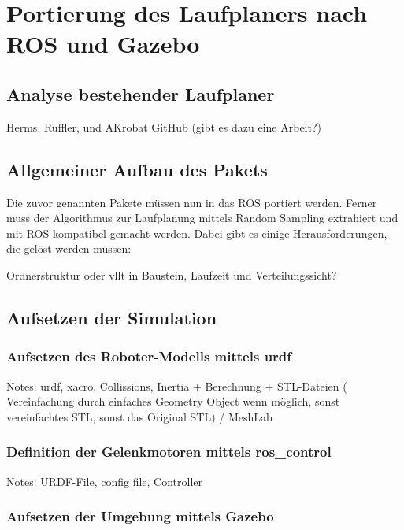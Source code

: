 \chapter{Portierung des Laufplaners nach ROS und Gazebo}

\section{Analyse bestehender Laufplaner}

Herms, Ruffler, und AKrobat GitHub (gibt es dazu eine Arbeit?)

\section{Allgemeiner Aufbau des Pakets}

Die zuvor genannten Pakete müssen nun in das \ac{ROS} portiert werden. Ferner muss der Algorithmus zur Laufplanung mittels Random Sampling extrahiert und mit \ac{ROS} kompatibel gemacht werden. Dabei gibt es einige Herausforderungen, die gelöst werden müssen:



Ordnerstruktur oder vllt in Baustein, Laufzeit und Verteilungssicht?

\section{Aufsetzen der Simulation}

\subsection{Aufsetzen des Roboter-Modells mittels urdf}

Notes: urdf, xacro, Collissions, Inertia + Berechnung + STL-Dateien ( Vereinfachung durch einfaches Geometry Object wenn möglich, sonst vereinfachtes STL, sonst das Original STL) / MeshLab

\subsection{Definition der Gelenkmotoren mittels ros\_control}

Notes: URDF-File, config file, Controller

\subsection{Aufsetzen der Umgebung mittels Gazebo}

